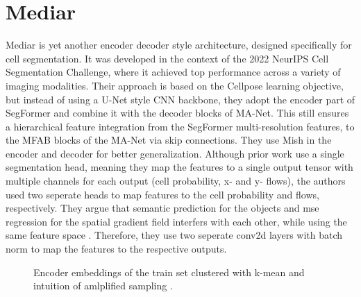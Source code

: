 \section{Mediar}

Mediar is yet another encoder decoder style architecture, designed specifically for cell segmentation. It was developed in the context of the 2022 NeurIPS Cell Segmentation Challenge, where it achieved top performance across a variety of imaging modalities. Their approach is based on the Cellpose learning objective, but instead of using a U-Net style CNN backbone, they adopt the encoder part of SegFormer and combine it with the decoder blocks of MA-Net. This still ensures a hierarchical feature integration from the SegFormer multi-resolution features, to the MFAB blocks of the MA-Net via skip connections. They use Mish in the encoder and decoder for better generalization.  Although prior work use a single segmentation head, meaning they map the features to a single output tensor with multiple channels for each output (cell probability, x- and y- flows), the authors used two seperate heads to map features to the cell probability and flows, respectively. They argue that semantic prediction for the objects and mse regression for the spatial gradient field interfers with each other, while using the same feature space \cite{caruana}. Therefore, they use two seperate conv2d layers with batch norm to map the features to the respective outputs.

\begin{figure}[!ht]
    \centering
    \caption{Encoder embeddings of the train set clustered with k-mean and intuition of amlplified sampling \cite{LeCun.1989}.}
    \label{fig:mediar_net}
\end{figure}


